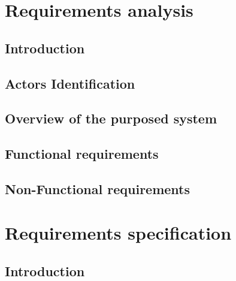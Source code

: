 \documentclass[openright]{report}
\begin{document}
	\begin{titlepage}
		
	\end{titlepage}


    \tableofcontents

    \begin{abstract}
		
	\end{abstract}


    \part{Requirements analysis}
    \chapter{Introduction}
    	
	\chapter{Actors Identification}
	    
    \chapter{Overview of the purposed system}
	    
    \chapter{Functional requirements}
    	
	\chapter{Non-Functional requirements}
    	




	\part{Requirements specification}
	\chapter{Introduction}
		
\end{document}
